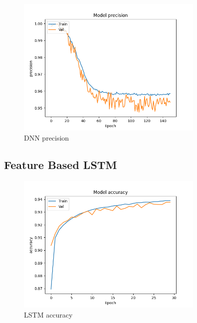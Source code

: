 \documentclass{article}
\begin{document}
    \begin{figure}[H]
        \centering
        \includegraphics[width=0.8\textwidth]{report_img/nn_results/feature_vector_dnn_26/metric_150_precision}
        \caption{DNN precision}
        \label{fig:}
    \end{figure}

    \subsection{Feature Based LSTM}

    \begin{figure}[H]
        \centering
        \includegraphics[width=0.8\textwidth]{report_img/nn_results/feature_vector_lstm_26/metric_accuracy}
        \caption{LSTM accuracy}
        \label{fig:}
    \end{figure}
\end{document}
